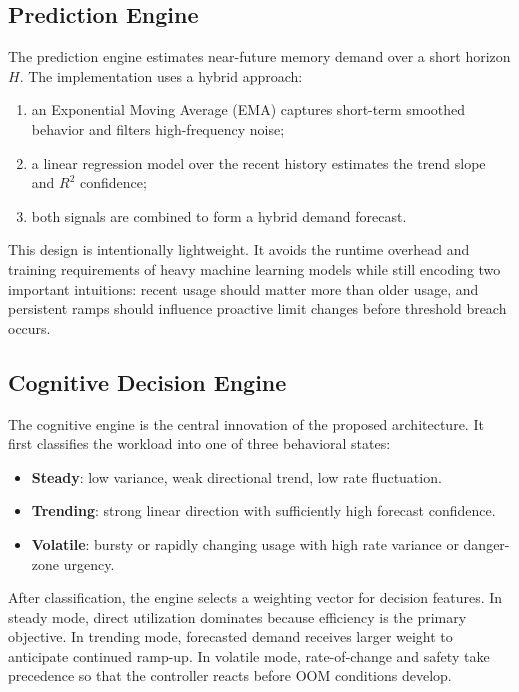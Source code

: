 \documentclass[12pt,a4paper]{article}
\begin{document}
\subsection{Prediction Engine}

The prediction engine estimates near-future memory demand over a short horizon $H$. The implementation uses a hybrid approach:
\begin{enumerate}[label=\arabic*)]
    \item an Exponential Moving Average (EMA) captures short-term smoothed behavior and filters high-frequency noise;
    \item a linear regression model over the recent history estimates the trend slope and $R^2$ confidence;
    \item both signals are combined to form a hybrid demand forecast.
\end{enumerate}

This design is intentionally lightweight. It avoids the runtime overhead and training requirements of heavy machine learning models while still encoding two important intuitions: recent usage should matter more than older usage, and persistent ramps should influence proactive limit changes before threshold breach occurs.

\subsection{Cognitive Decision Engine}

The cognitive engine is the central innovation of the proposed architecture. It first classifies the workload into one of three behavioral states:
\begin{itemize}
    \item \textbf{Steady}: low variance, weak directional trend, low rate fluctuation.
    \item \textbf{Trending}: strong linear direction with sufficiently high forecast confidence.
    \item \textbf{Volatile}: bursty or rapidly changing usage with high rate variance or danger-zone urgency.
\end{itemize}

After classification, the engine selects a weighting vector for decision features. In steady mode, direct utilization dominates because efficiency is the primary objective. In trending mode, forecasted demand receives larger weight to anticipate continued ramp-up. In volatile mode, rate-of-change and safety take precedence so that the controller reacts before OOM conditions develop.
\end{document}
